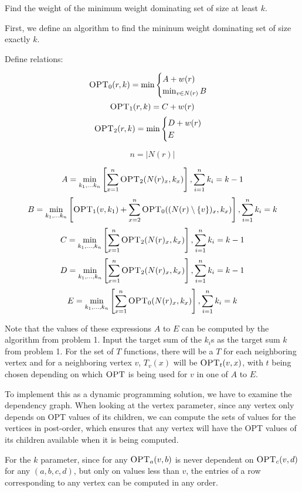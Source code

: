 \documentclass{article}
\begin{document}
Find the weight of the minimum weight dominating set of size at least $k$.

First, we define an algorithm to find the mininum weight dominating set of
size exactly $k$.

Define relations:

$$\textsc{OPT}_0(r, k) = \min 
\begin{cases} 
    A + w(r) \\
    \min_{v \in N(r)} B
\end{cases}$$
$$\textsc{OPT}_1(r, k) = C + w(r)$$
$$\textsc{OPT}_2(r, k) = \min
\begin{cases}
    D + w(r) \\
    E
\end{cases}$$

$$n = |N(r)|$$

$$A = \min_{k_1,...k_n} \left[\sum_{x = 1}^n \textsc{OPT}_2(N(r)_x, k_x) \right], \sum_{i=1}^n
k_i = k - 1$$
$$B = \min_{k_1,...k_n} \left[\textsc{OPT}_1(v,k_1) + \sum_{x = 2}^n
\textsc{OPT}_0((N(r) \setminus \{v\})_x, k_x) \right], \sum_{i=1}^n
k_i = k$$
$$C = \min_{k_1,...,k_n} \left[ \sum_{x=1}^n \textsc{OPT}_2(N(r)_x,k_x)\right], \sum_{i=1}^n
k_i = k - 1$$
$$D = \min_{k_1,...,k_n} \left[\sum_{x=1}^n \textsc{OPT}_2(N(r)_x, k_x)\right], \sum_{i=1}^n
k_i = k - 1 $$
$$E = \min_{k_1,...,k_n} \left[\sum_{x=1}^n \textsc{OPT}_0(N(r)_x, k_x)\right], \sum_{i=1}^n
k_i = k$$

Note that the values of these expressions $A$ to $E$ can be computed by the
algorithm from problem 1. Input the target sum of the $k_i$s as the target sum
$k$ from problem 1. For the set of $T$ functions, there will be a $T$ for each
neighboring vertex and for a neighboring vertex $v$, $T_v(x)$ will be
$\textsc{OPT}_t(v, x)$, with $t$ being chosen depending on which
$\textsc{OPT}$ is being used for $v$ in one of $A$ to $E$.

To implement this as a dynamic programming solution, we have to examine the
dependency graph. When looking at the vertex parameter, since any vertex only
depends on \textsc{OPT} values of its children, we can compute the
sets of values for the vertices in post-order, which ensures that any vertex
will have the \textsc{OPT} values of its children available when it is being
computed.

For the $k$ parameter, since for any $\textsc{OPT}_a(v,b)$ is never dependent
on $\textsc{OPT}_c(v,d)$ for any $(a,b,c,d)$, but only on values less than
$v$, the entries of a row corresponding to any vertex can be computed in any
order. 
\end{document}
